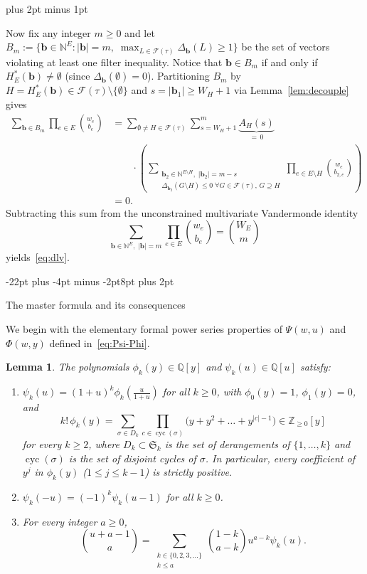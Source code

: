 \documentclass[11pt,letterpaper]{article}
\makeatletter
\renewcommand{\section}{\@startsection{section}{1}{\z@}%
  {-22pt plus -4pt minus -2pt}{8pt plus 2pt}%
  {\normalfont\fontsize{14}{17}\selectfont\bfseries\raggedright}}
\renewenvironment{proof}[1][\proofname]{%
  \par\pushQED{\qed}\normalfont
  \topsep9pt plus 2pt minus 1pt\relax
  \trivlist\item[\hskip\labelsep\itshape #1\@addpunct{.}]\ignorespaces
}{\popQED\endtrivlist\@endpefalse}
\theoremstyle{result}
\newtheorem{lemma}[theorem]{Lemma}
\theoremstyle{definition}
\theoremstyle{remark}
\newcommand{\NN}{\mathbb{N}}
\newcommand{\ZZ}{\mathbb{Z}}
\newcommand{\QQ}{\mathbb{Q}}
\newcommand{\fF}{\mathcal{F}}
\newcommand{\cyc}{\operatorname{cyc}}
\makeatother
\begin{document}
\begin{proof}[Proof of Theorem~\ref{thm:dlv}]
Now fix any integer $m\ge 0$ and let $B_m:=\{\mathbf{b}\in\NN^E : |\mathbf{b}|=m,\; \max_{L\in\fF(\tau)}\Delta_{\mathbf{b}}(L)\ge 1\}$ be the set of vectors violating at least one filter inequality. Notice that $\mathbf{b}\in B_m$ if and only if $H^*_E(\mathbf{b})\ne\emptyset$ (since $\Delta_{\mathbf{b}}(\emptyset)=0$). Partitioning $B_m$ by $H=H^*_E(\mathbf{b})\in\fF(\tau)\setminus\{\emptyset\}$ and $s=|\mathbf{b}_1|\ge W_H+1$ via Lemma~\ref{lem:decouple} gives
\[
\begin{aligned}
\sum_{\mathbf{b}\in B_m}\prod_{e\in E}\binom{w_e}{b_e}
  &= \sum_{\emptyset\ne H\in\fF(\tau)} \sum_{s=W_H+1}^{m}
     \underbrace{A_H(s)}_{=\,0}\\
  &\qquad\mathord{}\cdot
     \left(\sum_{\substack{\mathbf{b}_2\in\NN^{E\setminus H},\;|\mathbf{b}_2|=m-s\\
        \Delta_{\mathbf{b}_2}(G\setminus H)\le 0\;\forall G\in\fF(\tau),\,G\supseteq H}}
       \prod_{e\in E\setminus H}\binom{w_e}{b_{2,e}}\right)\\
  &= 0.
\end{aligned}
\]
Subtracting this sum from the unconstrained multivariate Vandermonde identity
\[
\sum_{\mathbf{b}\in\NN^E,\; |\mathbf{b}|=m}\prod_{e\in E}\binom{w_e}{b_e} = \binom{W_E}{m}
\]
yields~\eqref{eq:dlv}.
\end{proof}

\section{The master formula and its consequences}
\label{sec:mainproof}

We begin with the elementary formal power series properties of $\Psi(w,u)$ and $\Phi(w,y)$ defined in~\eqref{eq:Psi-Phi}.

\begin{samepage}
\begin{lemma}\label{lem:series}
The polynomials $\phi_k(y)\in\QQ[y]$ and $\psi_k(u)\in\QQ[u]$ satisfy:
\begin{enumerate}
\item[(1)] $\psi_k(u)=(1+u)^k\phi_k\!\left(\frac{u}{1+u}\right)$ for all $k\ge 0$, with $\phi_0(y)=1$, $\phi_1(y)=0$, and
\[
k!\,\phi_k(y) = \sum_{\sigma\in D_k} \prod_{c\in\cyc(\sigma)}\bigl(y+y^2+\dots+y^{|c|-1}\bigr) \in \ZZ_{\ge 0}[y]
\]
for every $k\ge 2$, where $D_k\subset\mathfrak{S}_k$ is the set of derangements of $\{1,\dots,k\}$ and $\cyc(\sigma)$ is the set of disjoint cycles of $\sigma$. In particular, every coefficient of $y^j$ in $\phi_k(y)$ ($1\le j\le k-1$) is strictly positive.
\item[(2)] $\psi_k(-u) = (-1)^k \psi_k(u-1)$ for all $k\ge 0$.
\item[(3)] For every integer $a\ge 0$,
\begin{equation}\label{eq:binom-expand}
\binom{u+a-1}{a} = \sum_{\substack{k\in\{0,2,3,\dots\} \\ k\le a}} \binom{1-k}{a-k} u^{a-k} \psi_k(u).
\end{equation}
\end{enumerate}
\end{lemma}
\end{samepage}
\end{document}
